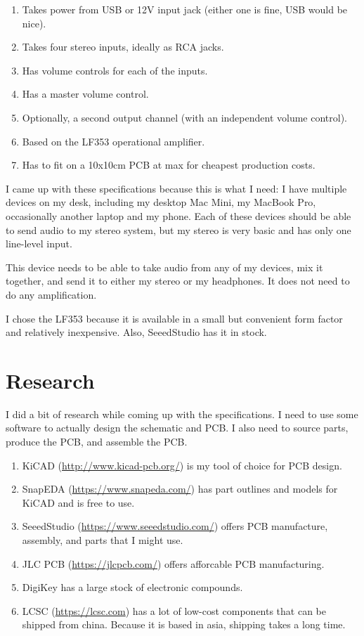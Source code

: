 \documentclass[a4paper]{article}
\begin{document}
\begin{enumerate}
  \item Takes power from USB or 12V input jack (either one is fine, USB would be nice).
  \item Takes four stereo inputs, ideally as RCA jacks.
  \item Has volume controls for each of the inputs.
  \item Has a master volume control.
  \item Optionally, a second output channel (with an independent volume control).
  \item Based on the LF353 operational amplifier.
  \item Has to fit on a 10x10cm PCB at max for cheapest production costs.
\end{enumerate}

I came up with these specifications because this is what I need: I have multiple devices on my desk, including my desktop Mac Mini, my MacBook Pro, occasionally another laptop and my phone. Each of these devices should be able to send audio to my stereo system, but my stereo is very basic and has only one line-level input.

This device needs to be able to take audio from any of my devices, mix it together, and send it to either my stereo or my headphones. It does not need to do any amplification.

I chose the LF353 because it is available in a small but convenient form factor and relatively inexpensive. Also, SeeedStudio has it in stock.

\section{Research}

I did a bit of research while coming up with the specifications. I need to use some software to actually design the schematic and PCB. I also need to source parts, produce the PCB, and assemble the PCB.

\begin{enumerate}
  \item KiCAD (\url{http://www.kicad-pcb.org/}) is my tool of choice for PCB design.
  \item SnapEDA (\url{https://www.snapeda.com/}) has part outlines and models for KiCAD and is free to use.
  \item SeeedStudio (\url{https://www.seeedstudio.com/}) offers PCB manufacture, assembly, and parts that I might use.
  \item JLC PCB (\url{https://jlcpcb.com/}) offers afforcable PCB manufacturing.
  \item DigiKey has a large stock of electronic compounds.
  \item LCSC (\url{https://lcsc.com}) has a lot of low-cost components that can be shipped from china. Because it is based in asia, shipping takes a long time.
\end{enumerate}
\end{document}
